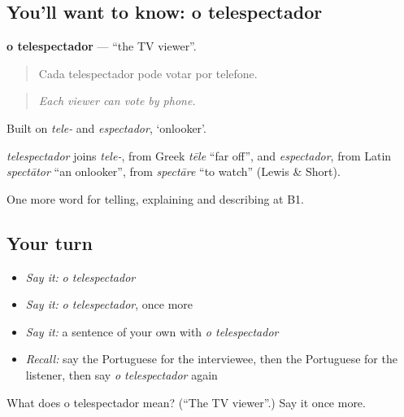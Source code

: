 \subsection*{You'll want to know: o telespectador}
\textbf{o telespectador} — \textquotedblleft{}the TV viewer\textquotedblright{}.

\begin{quote}
Cada telespectador pode votar por telefone.
\end{quote}

\begin{quote}
\emph{Each viewer can vote by phone.}
\end{quote}

Built on \emph{tele-} and \emph{espectador}, ‘onlooker’.

\begin{cousinweb}
\emph{telespectador} joins \emph{tele-}, from Greek \emph{tēle} \textquotedblleft{}far off\textquotedblright{}, and \emph{espectador}, from Latin \emph{spectātor} \textquotedblleft{}an onlooker\textquotedblright{}, from \emph{spectāre} \textquotedblleft{}to watch\textquotedblright{} (Lewis \& Short).
\end{cousinweb}

\begin{grammarlens}[title={What you've built}]
One more word for telling, explaining and describing at B1.
\end{grammarlens}

\subsection*{Your turn}
\begin{itemize}
\raggedright
  \item \emph{Say it:} \emph{o telespectador}
  \item \emph{Say it:} \emph{o telespectador}, once more
  \item \emph{Say it:} a sentence of your own with \emph{o telespectador}
  \item \emph{Recall:} say the Portuguese for the interviewee, then the Portuguese for the listener, then say \emph{o telespectador} again
\end{itemize}

\begin{tcolorbox}[breakable,colback=teal!4,colframe=teal!35!black,title={Before you move on}]
What does o telespectador mean? (\textquotedblleft{}The TV viewer\textquotedblright{}.) Say it once more.
\end{tcolorbox}

